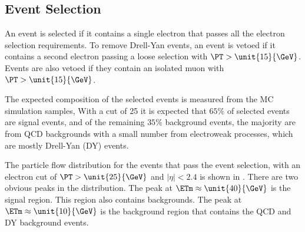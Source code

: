 \subsection{Event Selection}
An event is selected if it contains a single electron that passes all the
electron selection requirements.  To remove Drell-Yan events, an event is vetoed
if it contains a second electron passing a loose selection with $\PT >
\unit{15}{\GeV}$.  Events are also vetoed if they contain an isolated muon with
$\PT > \unit{15}{\GeV}$.

The expected composition of the selected events is measured from the MC
simulation samples, With a \pT cut of \unit{25}{\GeV} it is expected that $65\%$
of selected events are signal events, and of the remaining $35\%$ background
events, the majority are from {QCD} backgrounds with a small number from
{electroweak} processes, which are mostly Drell-Yan (DY) events. 


The particle flow \ETm distribution for the events that pass the event
selection, with an electron cut of $\PT > \unit{25}{\GeV}$ and $|\eta| < 2.4$ is
shown in . There are two obvious peaks in the
distribution. The peak at $\ETm \approx \unit{40}{\GeV}$ is the
\HepProcess{\PW\to\Pe\Pnue} signal region. This region also contains
\HepProcess{\PW\to\Ptau\Pnut} backgrounds. The peak at
$\ETm\approx \unit{10}{\GeV}$ is the background region that contains the {QCD}
and {DY} background events.

